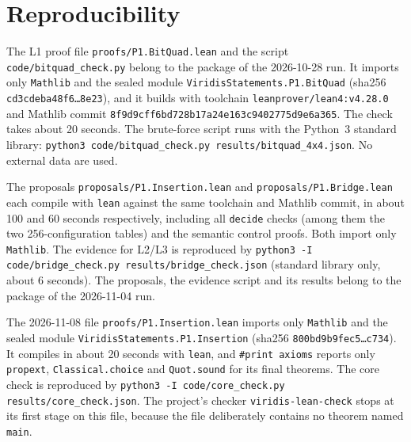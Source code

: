 \documentclass[11pt]{article}
\theoremstyle{definition}
\theoremstyle{remark}
\begin{document}
\section{Reproducibility}
{\sloppy

The L1 proof file \texttt{proofs/P1.BitQuad.lean} and the script
\texttt{code/bitquad\_check.py} belong to the package of the 2026-10-28 run. It imports only
\texttt{Mathlib} and the sealed module \texttt{ViridisStatements.P1.BitQuad}
(sha256 \texttt{cd3cdeba48f6\ldots{}8e23}), and it builds with toolchain
\texttt{leanprover/lean4:v4.28.0} and Mathlib commit
\texttt{8f9d9cff6bd728b17a24e163c9402775d9e6a365}. The check takes about 20
seconds. The brute-force script runs with the Python~3 standard library:
\texttt{python3 code/bitquad\_check.py results/bitquad\_4x4.json}. No external
data are used.

The proposals \texttt{proposals/P1.Insertion.lean} and
\texttt{proposals/P1.Bridge.lean} each compile with \texttt{lean} against the
same toolchain and Mathlib commit, in about 100 and 60 seconds respectively,
including all \texttt{decide} checks (among them the two 256-configuration
tables) and the semantic control proofs. Both import only \texttt{Mathlib}. The evidence
for L2/L3 is reproduced by \texttt{python3 -I code/bridge\_check.py
results/bridge\_check.json} (standard library only, about 6 seconds). The
proposals, the evidence script and its results belong to the package of the
2026-11-04 run.

The 2026-11-08 file \texttt{proofs/P1.Insertion.lean} imports only
\texttt{Mathlib} and the sealed module \texttt{ViridisStatements.P1.Insertion}
(sha256 \texttt{800bd9b9fec5\ldots{}c734}). It compiles in about 20 seconds with
\texttt{lean}, and \texttt{\#print axioms} reports only \texttt{propext},
\texttt{Classical.choice} and \texttt{Quot.sound} for its final theorems. The
core check is reproduced by \texttt{python3 -I code/core\_check.py
results/core\_check.json}. The project's checker \texttt{viridis-lean-check} stops at its first
stage on this file, because the file deliberately contains no theorem named
\texttt{main}.

}
\end{document}
